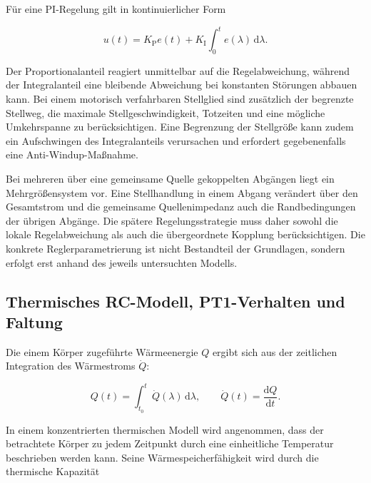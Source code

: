 Für eine PI-Regelung gilt in kontinuierlicher Form

\begin{equation}
  u(t)
  =
  K_{\mathrm{P}}e(t)
  +
  K_{\mathrm{I}}
  \int_0^t e(\lambda)\,\mathrm{d}\lambda.
  \label{eq:pi_regler}
\end{equation}

Der Proportionalanteil reagiert unmittelbar auf die Regelabweichung, während
der Integralanteil eine bleibende Abweichung bei konstanten Störungen abbauen
kann. Bei einem motorisch verfahrbaren Stellglied sind zusätzlich der
begrenzte Stellweg, die maximale Stellgeschwindigkeit, Totzeiten und eine
mögliche Umkehrspanne zu berücksichtigen. Eine Begrenzung der Stellgröße kann
zudem ein Aufschwingen des Integralanteils verursachen und erfordert
gegebenenfalls eine Anti-Windup-Maßnahme.

Bei mehreren über eine gemeinsame Quelle gekoppelten Abgängen liegt ein
Mehrgrößensystem vor. Eine Stellhandlung in einem Abgang verändert über den
Gesamtstrom und die gemeinsame Quellenimpedanz auch die Randbedingungen der
übrigen Abgänge. Die spätere Regelungsstrategie muss daher sowohl die lokale
Regelabweichung als auch die übergeordnete Kopplung berücksichtigen. Die
konkrete Reglerparametrierung ist nicht Bestandteil der Grundlagen, sondern
erfolgt erst anhand des jeweils untersuchten Modells.


\subsection{Thermisches RC-Modell, PT1-Verhalten und Faltung}
\label{sec:thermisches_rc_grundlagen}

Die einem Körper zugeführte Wärmeenergie \(Q\) ergibt sich aus der zeitlichen
Integration des Wärmestroms \(\dot Q\):

\begin{equation}
  Q(t)
  =
  \int_{t_0}^{t}\dot Q(\lambda)\,\mathrm{d}\lambda,
  \qquad
  \dot Q(t)
  =
  \frac{\mathrm{d}Q}{\mathrm{d}t}.
  \label{eq:waermeenergie_waermestrom}
\end{equation}

In einem konzentrierten thermischen Modell wird angenommen, dass der
betrachtete Körper zu jedem Zeitpunkt durch eine einheitliche Temperatur
beschrieben werden kann. Seine Wärmespeicherfähigkeit wird durch die
thermische Kapazität

